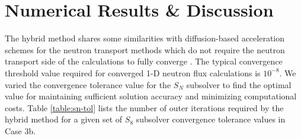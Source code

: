 \documentclass[letterpaper]{mc2025}
\begin{document}
\section{Numerical Results \& Discussion}

The hybrid method shares some similarities with diffusion-based acceleration schemes
for the neutron transport methods which do not require the neutron transport side of the
calculations to fully converge \cite{wang_diffusion_2014}. The typical convergence threshold value
required for converged 1-D neutron flux calculations is $10^{-8}$. We varied the convergence
tolerance value for the $S_N$ subsolver to find the optimal value for maintaining sufficient
solution accuracy and minimizing computational costs.
Table \ref{table:sn-tol} lists the number of outer iterations required by the hybrid method for
a given set of $S_8$ subsolver convergence tolerance values in Case 3b.
\end{document}
